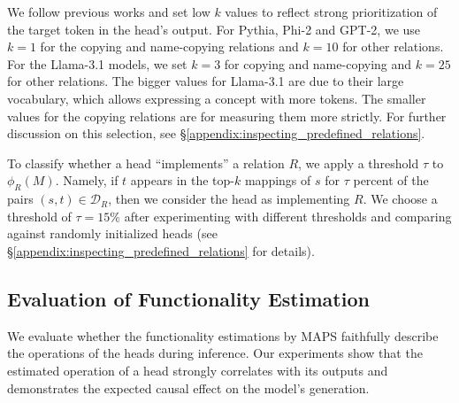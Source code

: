 \documentclass[11pt]{article}
\newcommand{\llama}{Llama-3.1}
\newcommand{\PHI}{Phi-2}
\newcommand{\Pythia}{Pythia}
\newcommand{\GPT}{GPT-2}
\newcommand{\framework}{\textsc{MAPS}}
\begin{document}
We follow previous works \citep{Dar2022AnalyzingTI,geva-etal-2021-transformer,geva-etal-2022-transformer} and set low $k$ values to reflect strong prioritization of the target token in the head's output. For \Pythia{}, \PHI{} and \GPT{}, we use $k=1$ for the copying and name-copying relations and $k=10$ for other relations. For the \llama{} models, we set $k=3$ for copying and name-copying and $k=25$ for other relations. The bigger values for \llama{} are due to their large vocabulary, which allows expressing a concept with more tokens. The smaller values for the copying relations are for measuring them more strictly. For further discussion on this selection, see \S\ref{appendix:inspecting_predefined_relations}.

To classify whether a head ``implements'' a relation $R$, we apply a threshold $\tau$ to $\phi_R(M)$. Namely, if $t$ appears in the top-$k$ mappings of $s$ for $\tau$ percent of the pairs $(s,t) \in \mathcal{D}_R$, then we consider the head as implementing $R$.
We choose a threshold of $\tau = 15\%$ after experimenting with different thresholds and comparing against randomly initialized heads (see \S\ref{appendix:inspecting_predefined_relations} for details). 



\subsection{Evaluation of Functionality Estimation}
\label{subsec:quality_of_predefined}

We evaluate whether the functionality estimations by \framework{} faithfully describe the operations of the heads during inference. Our experiments show that the estimated operation of a head strongly correlates with its outputs and demonstrates the expected causal effect on the model's generation.
\end{document}
